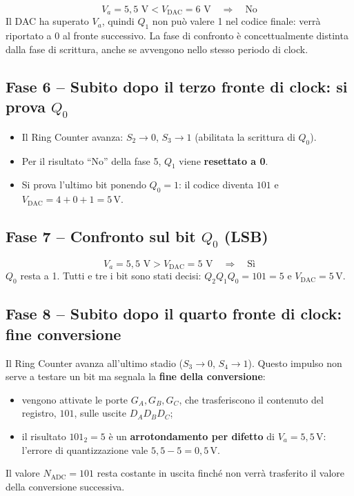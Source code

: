 \[
V_a = 5{,}5\text{ V} < V_{\text{DAC}} = 6\text{ V} \quad\Longrightarrow\quad \text{No}
\]
Il DAC ha superato $V_a$, quindi $Q_1$ non può valere 1 nel codice finale: verrà riportato a
0 al fronte successivo. La fase di confronto è concettualmente distinta dalla fase di
scrittura, anche se avvengono nello stesso periodo di clock.

\subsection*{Fase 6 -- Subito dopo il terzo fronte di clock: si prova $Q_0$}

\begin{itemize}[leftmargin=1.5em, itemsep=2pt]
    \item Il Ring Counter avanza: $S_2\to 0$, $S_3\to 1$ (abilitata la scrittura di $Q_0$).
    \item Per il risultato ``No'' della fase 5, $Q_1$ viene \textbf{resettato a 0}.
    \item Si prova l'ultimo bit ponendo $Q_0=1$: il codice diventa $101$ e
          $V_{\text{DAC}} = 4 + 0 + 1 = 5$\,V.
\end{itemize}

\subsection*{Fase 7 -- Confronto sul bit $Q_0$ (LSB)}

\[
V_a = 5{,}5\text{ V} > V_{\text{DAC}} = 5\text{ V} \quad\Longrightarrow\quad \text{Sì}
\]
$Q_0$ resta a 1. Tutti e tre i bit sono stati decisi:
$Q_2 Q_1 Q_0 = 101 = 5$ e $V_{\text{DAC}}=5$\,V.

\subsection*{Fase 8 -- Subito dopo il quarto fronte di clock: fine conversione}

Il Ring Counter avanza all'ultimo stadio ($S_3\to 0$, $S_4\to 1$). Questo impulso non serve a
testare un bit ma segnala la \textbf{fine della conversione}:
\begin{itemize}[leftmargin=1.5em, itemsep=2pt]
    \item vengono attivate le porte $G_A, G_B, G_C$, che trasferiscono il contenuto del
          registro, $101$, sulle uscite $D_A D_B D_C$;
    \item il risultato $101_2 = 5$ è un \textbf{arrotondamento per difetto} di
          $V_a = 5{,}5$\,V: l'errore di quantizzazione vale $5{,}5-5 = 0{,}5$\,V.
\end{itemize}
Il valore $N_{\text{ADC}} = 101$ resta costante in uscita finché non verrà trasferito il
valore della conversione successiva.

